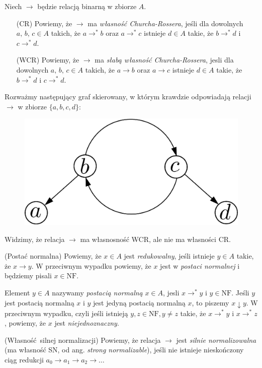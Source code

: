 \begin{definicja}
  Niech \(\to\) będzie relacją binarną w zbiorze \(A\). 
\begin{enumerate}
  \setlength\itemsep{0em}
  \item[(CR) ] Powiemy, że \(\to\) ma \emph{własność Churcha-Rossera}, jeśli
               dla dowolnych \(a,\,b,\,c\in A\) takich, że
               \(a\to^{*}b\) oraz \(a\to^{*} c\) istnieje \(d\in A\)
               takie, że \(b\to^{*} d\) i \(c\to^{*} d\).

  \item[(WCR)] Powiemy, że \(\to\) ma \emph{słabą własność 
               Churcha-Rossera}, jesli dla dowolnych \(a,\,b,\,c\in A\)
               takich, że \(a\to b\) oraz \(a\to c\) istnieje \(d\in A\) 
               takie, że \(b\to^{*} d\) i \(c\to^{*} d\).
\end{enumerate}
\end{definicja}
\begin{uwaga*}
  Rozważmy następujący graf skierowany, w którym krawdzie odpowiadają relacji \(\to\) w zbiorze \(\{a,b,c,d\}\):
  \begin{figure}[h]
    \centering
    \includegraphics[width=0.32\linewidth]{../wcrnotcr_example}
  \end{figure}

  Widzimy, że relacja \(\to\) ma własnosność WCR, ale nie ma własności CR.
\end{uwaga*}
\begin{definicja}(Postać normalna)
  Powiemy, że \(x\in A\) jest \emph{redukowalny}, jeśli istnieje \(y\in A\) takie, że \(x\to y\). W przeciwnym wypadku powiemy, że \(x\) jest w \emph{postaci normalnej} i będziemy pisali \(x\in\mathrm{NF}\). 
  
  Element \(y\in A\) nazywamy \emph{postacią normalną} \(x\in A\), jesli \(x\to^{*}y\) i \(y\in\mathrm{NF}\). Jeśli \(y\) jest postacią normalną \(x\) i \(y\) jest jedyną postacią normalną \(x\), to piszemy \(x\downarrow y\). W przeciwnym wypadku, czyli jeśli istnieją \(y, z\in \mathrm{NF}, y\neq z\) takie, że \(x\to^{*} y\) i \(x\to^{*} z\), powiemy, że \(x\) jest \emph{niejednoznaczny}. 
\end{definicja}

\begin{definicja}(Własność silnej normalizacji)
  Powiemy, że relacja \(\to\) jest \emph{silnie normalizowalna} (ma własność SN, od ang. \emph{strong normalizable}), jeśli nie istnieje nieskończony ciąg redukcji \(a_0 \to a_1 \to a_2 \to \dots\)
\end{definicja}

